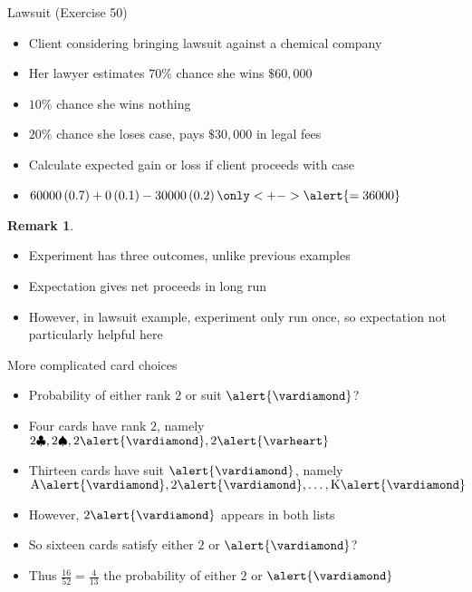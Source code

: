 \documentclass{beamer}
\theoremstyle{definition}
\newtheorem{remark}{Remark}
\begin{document}
\begin{frame}{Lawsuit (Exercise 50)}
\begin{itemize}
\item Client considering bringing lawsuit against a chemical company
\item Her lawyer estimates $70\%$ chance she wins $\$60,000$
\item $10\%$ chance she wins nothing
\item $20\%$ chance she loses case, pays $\$30,000$ in legal fees
\item Calculate expected gain or loss if client proceeds with case
\item $60000\left(0.7\right)
+0\left(0.1\right)-30000\left(0.2\right)
\only<+->{\alert{=36000}}$
\end{itemize}
\begin{remark}
\begin{itemize}
\item Experiment has \alert{three} outcomes, unlike previous examples
\item Expectation gives net proceeds \alert{in long run}
\item However, in lawsuit example, experiment only run once,
so expectation not particularly helpful here
\end{itemize}
\end{remark}
\end{frame}

\begin{frame}{More complicated card choices}
\begin{itemize}
\item Probability of \alert{either} rank $2$ or 
suit $\alert{\vardiamond}$?
\item Four cards have rank $2$, namely
$2\clubsuit, 2\spadesuit, 2\alert{\vardiamond}, 2\alert{\varheart}$
\item Thirteen cards have suit $\alert{\vardiamond}$, namely
$\text{A}\alert{\vardiamond},2\alert{\vardiamond},\ldots,
\text{K}\alert{\vardiamond}$
\item However, $2\alert{\vardiamond}$ appears in \alert{both} lists
\item So \alert{sixteen} cards satisfy \alert{either} $2$ or $\alert{\vardiamond}$?
\item Thus $\frac{16}{52}=\frac{4}{13}$ the probability of
\alert{either} $2$ or $\alert{\vardiamond}$
\end{itemize}
\end{frame}
\end{document}
